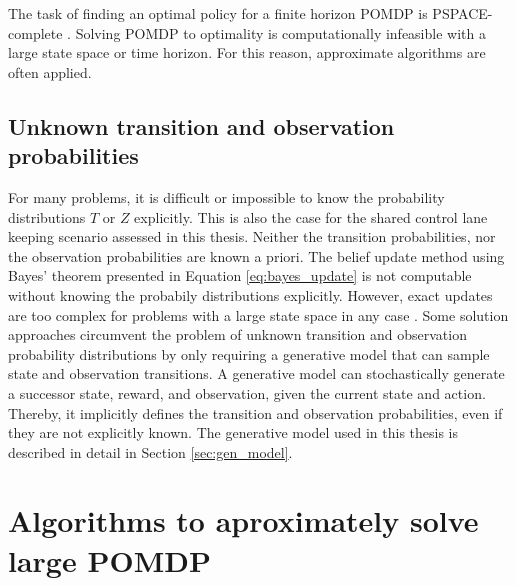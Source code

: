 The task of finding an optimal policy for a finite horizon POMDP is PSPACE-complete \parencite{pomdp_complex}. Solving POMDP to optimality is computationally infeasible with a large state space or time horizon. For this reason, approximate algorithms are often applied. 

\subsection{Unknown transition and observation probabilities}
\label{sec:gen_model_intro}
For many problems, it is difficult or impossible to know the probability distributions $T$ or $Z$ explicitly. This is also the case for the shared control lane keeping scenario assessed in this thesis. Neither the transition probabilities, nor the observation probabilities are known a priori. The belief update method using Bayes' theorem presented in Equation \ref{eq:bayes_update} is not computable without knowing the probabily distributions explicitly. However, exact updates are too complex for problems with a large state space in any case \parencite{pomcp}. Some solution approaches circumvent the problem of unknown transition and observation probability distributions by only requiring a generative model that can sample state and observation transitions. A generative model can stochastically generate a successor state, reward, and observation, given the current state and action. Thereby, it implicitly defines the transition and observation probabilities, even if they are not explicitly known. The generative model used in this thesis is described in detail in Section \ref{sec:gen_model}.


\section{Algorithms to aproximately solve large POMDP}



